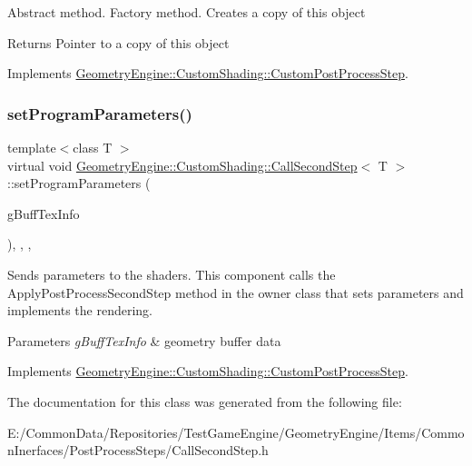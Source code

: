 Abstract method. Factory method. Creates a copy of this object \begin{DoxyReturn}{Returns}
Pointer to a copy of this object 
\end{DoxyReturn}


Implements \mbox{\hyperlink{class_geometry_engine_1_1_custom_shading_1_1_custom_post_process_step_af4f29e24fd6b7f13d211f3f3effe40eb}{Geometry\+Engine\+::\+Custom\+Shading\+::\+Custom\+Post\+Process\+Step}}.

\mbox{\label{class_geometry_engine_1_1_custom_shading_1_1_call_second_step_a31dfe9d64b6d938367f2adeecc1d37bb}} 
\subsubsection{\texorpdfstring{setProgramParameters()}{setProgramParameters()}}
{\footnotesize\ttfamily template$<$class T $>$ \\
virtual void \mbox{\hyperlink{class_geometry_engine_1_1_custom_shading_1_1_call_second_step}{Geometry\+Engine\+::\+Custom\+Shading\+::\+Call\+Second\+Step}}$<$ T $>$\+::set\+Program\+Parameters (\begin{DoxyParamCaption}\item[{const \mbox{\hyperlink{class_geometry_engine_1_1_g_buffer_texture_info}{G\+Buffer\+Texture\+Info}} \&}]{g\+Buff\+Tex\+Info }\end{DoxyParamCaption})\hspace{0.3cm}{\ttfamily [inline]}, {\ttfamily [override]}, {\ttfamily [protected]}, {\ttfamily [virtual]}}

Sends parameters to the shaders. This component calls the Apply\+Post\+Process\+Second\+Step method in the owner class that sets parameters and implements the rendering. 
\begin{DoxyParams}{Parameters}
{\em g\+Buff\+Tex\+Info} & geometry buffer data \\
\hline
\end{DoxyParams}


Implements \mbox{\hyperlink{class_geometry_engine_1_1_custom_shading_1_1_custom_post_process_step_ac52997f5ddea3cd39f3a71b4d1ab7683}{Geometry\+Engine\+::\+Custom\+Shading\+::\+Custom\+Post\+Process\+Step}}.



The documentation for this class was generated from the following file\+:\begin{DoxyCompactItemize}
\item 
E\+:/\+Common\+Data/\+Repositories/\+Test\+Game\+Engine/\+Geometry\+Engine/\+Items/\+Common\+Inerfaces/\+Post\+Process\+Steps/Call\+Second\+Step.\+h\end{DoxyCompactItemize}
